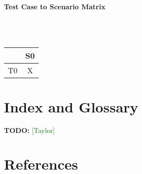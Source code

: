 \documentclass{article}
\newcommand{\taylor}{\textcolor{green}{[Taylor]}}
\begin{document}
\paragraph{Test Case to Scenario Matrix}~\\ \\
\begin{tabular}{ | c || c | }
\hline
    & S0 \\
\hline
\hline
T0 & X  \\
\hline

\end{tabular}
\section{Index and Glossary}
\textbf{TODO:} \taylor

\section{References}
\end{document}

